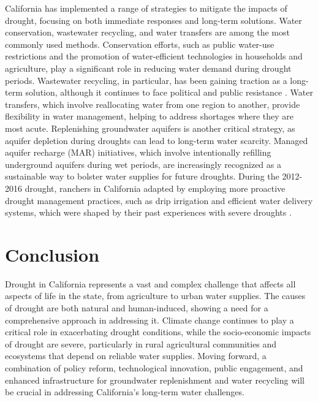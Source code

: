 \documentclass[
]{book}
\theoremstyle{definition}
\theoremstyle{definition}
\theoremstyle{definition}
\theoremstyle{definition}
\theoremstyle{remark}
\begin{document}
California has implemented a range of strategies to mitigate the impacts of drought, focusing on both immediate responses and long-term solutions. Water conservation, wastewater recycling, and water transfers are among the most commonly used methods. Conservation efforts, such as public water-use restrictions and the promotion of water-efficient technologies in households and agriculture, play a significant role in reducing water demand during drought periods. Wastewater recycling, in particular, has been gaining traction as a long-term solution, although it continues to face political and public resistance \citep{keavney2022}. Water transfers, which involve reallocating water from one region to another, provide flexibility in water management, helping to address shortages where they are most acute. Replenishing groundwater aquifers is another critical strategy, as aquifer depletion during droughts can lead to long-term water scarcity. Managed aquifer recharge (MAR) initiatives, which involve intentionally refilling underground aquifers during wet periods, are increasingly recognized as a sustainable way to bolster water supplies for future droughts. During the 2012-2016 drought, ranchers in California adapted by employing more proactive drought management practices, such as drip irrigation and efficient water delivery systems, which were shaped by their past experiences with severe droughts \citep{woodmansee2021}.

\section{Conclusion}\label{conclusion}

Drought in California represents a vast and complex challenge that affects all aspects of life in the state, from agriculture to urban water supplies. The causes of drought are both natural and human-induced, showing a need for a comprehensive approach in addressing it. Climate change continues to play a critical role in exacerbating drought conditions, while the socio-economic impacts of drought are severe, particularly in rural agricultural communities and ecosystems that depend on reliable water supplies. Moving forward, a combination of policy reform, technological innovation, public engagement, and enhanced infrastructure for groundwater replenishment and water recycling will be crucial in addressing California's long-term water challenges.

  
\end{document}
